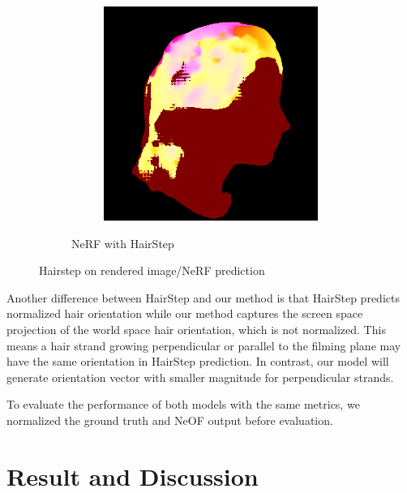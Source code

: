 \documentclass{article}
\begin{document}
\begin{figure}[h]
\begin{subfigure}{0.22\textwidth}
\begin{subfigure}{0.48\textwidth}
        \end{subfigure}
        \hfill
        \begin{subfigure}{0.48\textwidth}
            \centering
            \includegraphics[width=\textwidth]{./images/baseline-method/pred_6_hairstep.png}
        \end{subfigure}
        \caption{NeRF with HairStep}
    \end{subfigure}

    \caption{Hairstep on rendered image/NeRF prediction}
    \label{fig:nerf_hairstep}
\end{figure}

Another difference between HairStep and our method is that HairStep predicts normalized hair orientation while our method captures the screen space projection of the world space hair orientation, which is not normalized. This means a hair strand growing perpendicular or parallel to the filming plane may have the same orientation in HairStep prediction. In contrast, our model will generate orientation vector with smaller magnitude for perpendicular strands.

To evaluate the performance of both models with the same metrics, we normalized the ground truth and NeOF output before evaluation.

\section{Result and Discussion}
\end{document}
